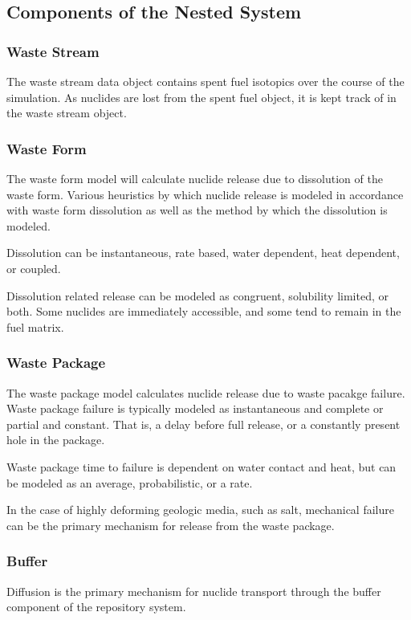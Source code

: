 \subsection{Components of the Nested System}
\subsubsection{Waste Stream}
The waste stream data object contains spent fuel isotopics over the 
course of the simulation. As nuclides are lost from the spent fuel 
object, it is kept track of in the waste stream object. 

\subsubsection{Waste Form}
The waste form model will calculate nuclide release due to dissolution 
of the waste form. Various heuristics by which nuclide release is modeled in 
accordance with waste form dissolution as well as the method by which 
the dissolution is modeled.

Dissolution can be instantaneous, rate based, water dependent, heat 
dependent, or coupled.

Dissolution related release can be modeled as congruent, solubility 
limited, or both. Some nuclides are immediately accessible, and some 
tend to remain in the fuel matrix. 

\subsubsection{Waste Package}
The waste package model calculates nuclide release due to waste 
pacakge failure. Waste package failure is typically modeled as 
instantaneous and complete or partial and constant. That is, a delay 
before full release, or a constantly present hole in the package.

Waste package time to failure is dependent on water contact and heat, 
but can be modeled as an average, probabilistic, or a rate.

In the case of highly deforming geologic media, such as salt, 
mechanical failure can be the primary mechanism for release from the 
waste package.

\subsubsection{Buffer}
Diffusion is the primary mechanism for nuclide transport through the 
buffer component of the repository system.  

